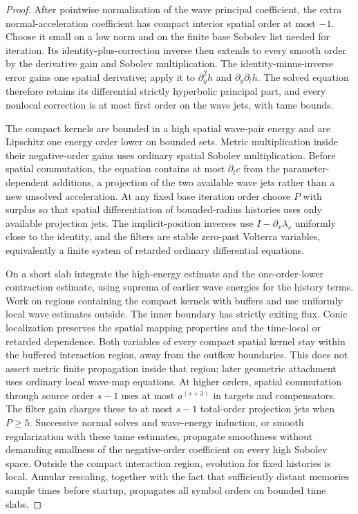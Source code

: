 \begin{proof}
After pointwise normalization of the wave principal coefficient,
the extra normal-acceleration coefficient has compact interior
spatial order at most $-1$.  Choose it small on a low norm and
on the finite base Sobolev list needed for iteration.
Its identity-plus-correction inverse then extends to every
smooth order by the derivative gain and Sobolev multiplication.
The identity-minus-inverse error gains one spatial derivative;
apply it to $\partial_y^2h$ and $\partial_y\partial_th$.
The solved equation therefore retains its differential strictly
hyperbolic principal part, and every nonlocal correction is
at most first order on the wave jets, with tame bounds.

The compact kernels are bounded in a high spatial wave-pair
energy and are Lipschitz one energy order lower on bounded
sets.  Metric multiplication inside their negative-order gains
uses ordinary spatial Sobolev multiplication.  Before spatial
commutation, the equation contains at most $\partial_tc$
from the parameter-dependent additions, a projection of the
two available wave jets rather than a new unsolved acceleration.
At any fixed base iteration order choose $P$ with surplus so
that spatial differentiation of bounded-radius histories uses
only available projection jets.  The implicit-position
inverses use $I-\partial_x\lambda_s$ uniformly close to the
identity, and the filters are stable zero-past Volterra
variables, equivalently a finite system of retarded ordinary
differential equations.

On a short slab integrate the high-energy estimate and the
one-order-lower contraction estimate, using suprema of
earlier wave energies for the history terms.  Work on regions
containing the compact kernels with buffers and use uniformly
local wave estimates outside.  The inner boundary has strictly
exiting flux. Conic localization preserves the spatial mapping properties and
the time-local or retarded dependence. Both variables of every compact
spatial kernel stay within the buffered interaction region, away from
the outflow boundaries. This does not assert metric finite propagation
inside that region; later geometric attachment uses ordinary local
wave-map equations.
At higher orders, spatial commutation through source order
$s-1$ uses at most $a^{(s+3)}$ in targets and compensators.
The filter gain charges these to at most $s-1$ total-order
projection jets when $P\geq5$.
Successive normal solves and wave-energy induction, or smooth
regularization with these tame estimates, propagate smoothness
without demanding smallness of the negative-order coefficient
on every high Sobolev space.  Outside the compact interaction
region, evolution for fixed histories is local.  Annular
rescaling, together with the fact that sufficiently distant
memories sample times before startup, propagates all symbol
orders on bounded time slabs.


\end{proof}
